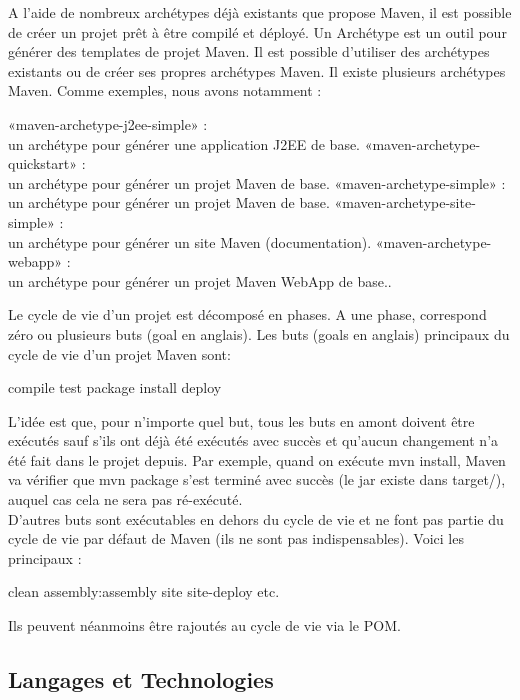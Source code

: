 A l'aide de nombreux archétypes déjà existants que propose Maven, il est possible de créer un projet prêt à être compilé et déployé. Un Archétype est un outil pour générer des templates de projet Maven. Il est possible d'utiliser des archétypes existants ou de créer ses propres archétypes Maven. Il existe plusieurs archétypes Maven. Comme exemples, nous avons notamment :
\begin{itemize}
	\itemcheck «maven-archetype-j2ee-simple» : \\
	un archétype pour générer une application J2EE de base.
	\itemcheck «maven-archetype-quickstart» : \\
	un archétype pour générer un projet Maven de base.
	\itemcheck «maven-archetype-simple» : \\
	un archétype pour générer un projet Maven de base.
	\itemcheck «maven-archetype-site-simple» : \\
	un archétype pour générer un site Maven (documentation).
	\itemcheck «maven-archetype-webapp» : \\
	un archétype pour générer un projet Maven WebApp de base..
\end{itemize}
Le cycle de vie d'un projet est décomposé en phases. A une phase, correspond zéro ou plusieurs buts (goal en anglais). Les buts (goals en anglais) principaux du cycle de vie d'un projet Maven sont:
\begin{itemize}
	\itemcheck compile
	\itemcheck test
	\itemcheck package
	\itemcheck install
	\itemcheck deploy
\end{itemize}
L'idée est que, pour n'importe quel but, tous les buts en amont doivent être exécutés sauf s'ils ont déjà été exécutés avec succès et qu'aucun changement n'a été fait dans le projet depuis. Par exemple, quand on exécute mvn install, Maven va vérifier que mvn package s'est terminé avec succès (le jar existe dans target/), auquel cas cela ne sera pas ré-exécuté.\\
D'autres buts sont exécutables en dehors du cycle de vie et ne font pas partie du cycle de vie par défaut de Maven (ils ne sont pas indispensables). Voici les principaux :
\begin{itemize}
	\itemcheck clean
	\itemcheck assembly:assembly
	\itemcheck site
	\itemcheck site-deploy
	\itemcheck etc.
\end{itemize}
Ils peuvent néanmoins être rajoutés au cycle de vie via le POM.
\subsection{Langages et Technologies}
